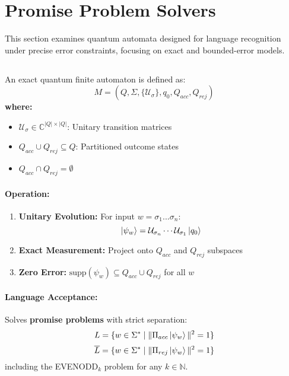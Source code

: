 \section{Promise Problem Solvers}
\label{sec:promise-qfa}

This section examines quantum automata designed for language recognition under precise error constraints, focusing on exact and bounded-error models.

\subsection{}
\label{subsec:exact-qfa}

\begin{definition}
An exact quantum finite automaton is defined as:
\[
M = (Q, \Sigma, \{\mathcal{U}_\sigma\}, q_0, Q_{acc}, Q_{rej})
\]
\textbf{where:}
\begin{itemize}
    \item $\mathcal{U}_\sigma \in \mathbb{C}^{|Q| \times |Q|}$: Unitary transition matrices
    \item $Q_{acc} \cup Q_{rej} \subseteq Q$: Partitioned outcome states
    \item $Q_{acc} \cap Q_{rej} = \emptyset$
\end{itemize}
\end{definition}

\paragraph{Operation:}
\begin{enumerate}
    \item \textbf{Unitary Evolution:} For input $w = \sigma_1...\sigma_n$:
    \[
    \ket{\psi_w} = \mathcal{U}_{\sigma_n} \cdots \mathcal{U}_{\sigma_1} \ket{q_0}
    \]
    \item \textbf{Exact Measurement:} Project onto $Q_{acc}$ and $Q_{rej}$ subspaces
    \item \textbf{Zero Error:} $\text{supp}(\psi_w) \subseteq Q_{acc} \cup Q_{rej}$ for all $w$ \cite{nayak1999optimal}
\end{enumerate}

\paragraph{Language Acceptance:}
Solves \textbf{promise problems} with strict separation:
\[
L = \{w \in \Sigma^* \mid \|\Pi_{acc}\ket{\psi_w}\|^2 = 1\}
\]
\[
\overline{L} = \{w \in \Sigma^* \mid \|\Pi_{rej}\ket{\psi_w}\|^2 = 1\}
\]
including the EVENODD$_k$ problem for any $k \in \mathbb{N}$.

